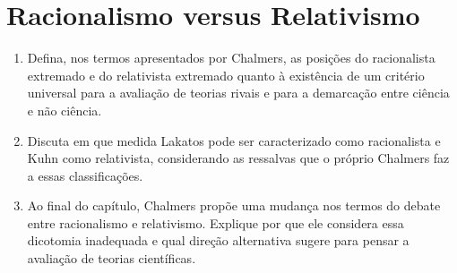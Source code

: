 \documentclass[10pt,a4paper]{extarticle}
\begin{document}
\section*{Racionalismo versus Relativismo}
\begin{enumerate}[resume, label=\textbf{\arabic*.}, itemsep=10pt]
  \item Defina, nos termos apresentados por Chalmers, as posições do racionalista extremado e do relativista extremado quanto à existência de um critério universal para a avaliação de teorias rivais e para a demarcação entre ciência e não ciência.
  \item Discuta em que medida Lakatos pode ser caracterizado como racionalista e Kuhn como relativista, considerando as ressalvas que o próprio Chalmers faz a essas classificações.
  \item Ao final do capítulo, Chalmers propõe uma mudança nos termos do debate entre racionalismo e relativismo. Explique por que ele considera essa dicotomia inadequada e qual direção alternativa sugere para pensar a avaliação de teorias científicas.
\end{enumerate}



\end{document}
